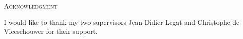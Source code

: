 
\begin{center}
\huge{\textsc{Acknowledgment}}
\end{center}
I would like to thank my two supervisors Jean-Didier Legat and Christophe de Vleeschouwer for their support.
\afterpage{\blankpage}
\newpage
